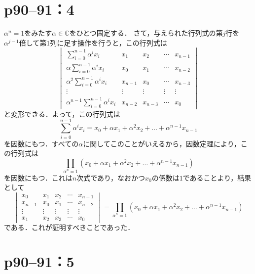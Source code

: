\section*{p90--91：4}

\begin{tproof}
  $\alpha ^n =1$をみたす$\alpha \in \mathbb{C}$をひとつ固定する．
  さて，与えられた行列式の第$j$行を$\alpha^{j-1}$倍して第$1$列に足す操作を行うと，この行列式は
  \[
    \begin{vmatrix}
      \sum_{i=0}^{n-1} \alpha^i x_i              & x_1     & x_2     & \cdots & x_{n-1} \\
      \alpha \sum_{i=0}^{n-1} \alpha^i x_i       & x_0     & x_1     & \cdots & x_{n-2} \\
      \alpha^2 \sum_{i=0}^{n-1} \alpha^i x_i     & x_{n-1} & x_0     & \cdots & x_{n-3} \\
      \vdots                                     & \vdots  & \vdots  & \vdots & \vdots  \\
      \alpha^{n-1} \sum_{i=0}^{n-1} \alpha^i x_i & x_{n-2} & x_{n-3} & \cdots & x_0
    \end{vmatrix}
  \]
  と変形できる．よって，この行列式は
  \[
    \sum_{i=0}^{n-1} \alpha^i x_i = x_0 + \alpha x_1 + \alpha^2 x_2 + \dots +\alpha^{n-1} x_{n-1}
  \]
  を因数にもつ．すべての$\alpha$に関してこのことがいえるから，因数定理により，この行列式は
  \[
    \prod_{\alpha^n=1} (x_0 + \alpha x_1 + \alpha^2 x_2 + \dots +\alpha^{n-1} x_{n-1})
  \]
  を因数にもつ．これは$n$次式であり，なおかつ$x_0$の係数は$1$であることより，結果として
  \[
    \begin{vmatrix}
      x_0     & x_1    & x_2    & \cdots & x_{n-1} \\
      x_{n-1} & x_0    & x_1    & \cdots & x_{n-2} \\
      \vdots  & \vdots & \vdots & \vdots & \vdots  \\
      x_1     & x_2    & x_3    & \cdots & x_0
    \end{vmatrix}
    =  \prod_{\alpha^n=1} (x_0 + \alpha x_1 + \alpha^2 x_2 + \dots +\alpha^{n-1} x_{n-1})
  \]
  である．これが証明すべきことであった．
\end{tproof}


\section*{p90--91：5}

